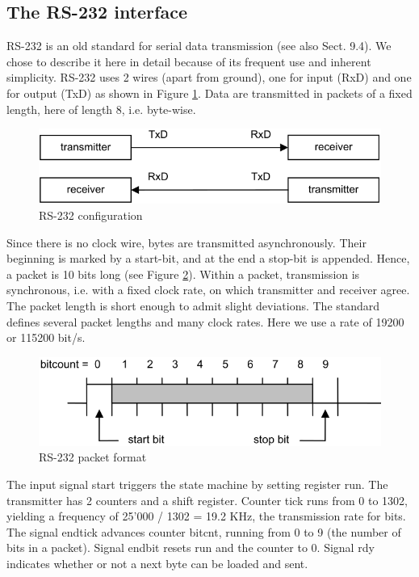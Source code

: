\subsection{The RS-232 interface}
RS-232 is an old standard for serial data transmission (see also Sect. 9.4). We chose to describe it
here in detail because of its frequent use and inherent simplicity. RS-232 uses 2 wires (apart from
ground), one for input (RxD) and one for output (TxD) as shown in Figure \ref{fig:rs232cfg}. Data are
transmitted in packets of a fixed length, here of length 8, i.e. byte-wise.
\begin{figure}[h!]
  \centering
  \includegraphics[width=.9\textwidth]{i/G/b.png}
  \caption{RS-232 configuration}
  \label{fig:rs232cfg}
\end{figure}
Since there is no clock wire,
bytes are transmitted asynchronously. Their beginning is marked by a start-bit, and at the end a
stop-bit is appended. Hence, a packet is 10 bits long (see Figure \ref{fig:rs232pac}). Within a packet,
transmission is synchronous, i.e. with a fixed clock rate, on which transmitter and receiver agree.
The packet length is short enough to admit slight deviations. The standard defines several packet
lengths and many clock rates. Here we use a rate of 19200 or 115200 bit/s.
\begin{figure}[h!]
  \centering
  \includegraphics[width=.96\textwidth]{i/G/c.png}
  \caption{RS-232 packet format}
  \label{fig:rs232pac}
\end{figure}

The input signal start triggers the state machine by setting register run. The transmitter has 2
counters and a shift register. Counter tick runs from 0 to 1302, yielding a frequency of 25’000 / 1302
= 19.2 KHz, the transmission rate for bits. The signal endtick advances counter bitcnt, running from
0 to 9 (the number of bits in a packet). Signal endbit resets run and the counter to 0. Signal rdy
indicates whether or not a next byte can be loaded and sent.

